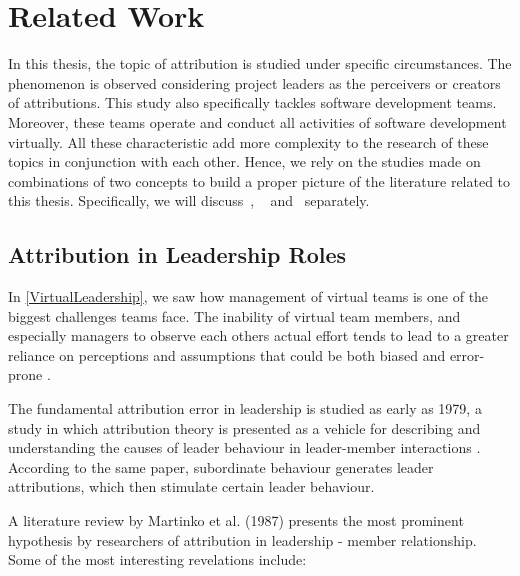 \chapter{Related Work}


In this thesis, the topic of attribution is studied under specific circumstances. The phenomenon is observed considering project leaders as the perceivers or creators of attributions. This study also specifically tackles software development teams. Moreover, these teams operate and conduct all activities of software development virtually. All these characteristic add more complexity to the research of these topics in conjunction with each other. Hence, we rely on the studies made on combinations of two concepts to build a proper picture of the literature related to this thesis.  Specifically, we will discuss~, ~ and~ separately.

\section{Attribution in Leadership Roles}\label{AttLeadership}

In \ref{VirtualLeadership}, we saw how management of virtual teams is one of the biggest challenges teams face.  The inability of virtual team members, and especially managers to observe each others actual effort tends to lead to a greater reliance on perceptions and assumptions that could be both biased and error-prone \cite{Penarroja2013}.

The fundamental attribution error in leadership is studied as early as 1979, a study in which attribution theory is presented as a vehicle for describing and understanding the causes of leader behaviour in leader-member interactions \cite{Green1979}. According to the same paper, subordinate behaviour generates leader attributions, which then stimulate certain leader behaviour.  

A literature review by Martinko et al.  (1987) presents the most prominent hypothesis by researchers of attribution in leadership - member relationship.  Some of the most interesting revelations include:

